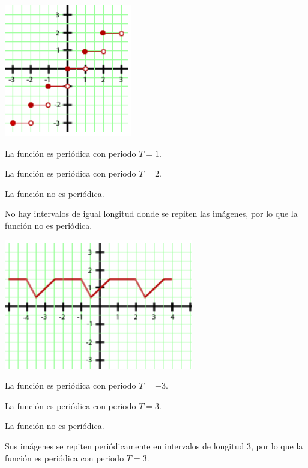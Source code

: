 \includegraphics{samples/propiedades/periodicidad4.jpg}
\begin{scq}
	\begin{choices}
		\begin{choice}
			La función es periódica con periodo $T=1$.	
		\end{choice}
		\begin{choice}[x]
			La función es periódica con periodo $T=2$.
		\end{choice}	
		\begin{choice}[x]
			La función no es periódica.
		\end{choice}
	\end{choices}
	\begin{feedback}
		No hay intervalos de igual longitud donde se repiten las imágenes, por lo que la función no es periódica.
	\end{feedback}
\end{scq}


\includegraphics{samples/propiedades/periodicidad5.jpg}
\begin{scq}
	\begin{choices}
		\begin{choice}
			La función es periódica con periodo $T=-3$.	
		\end{choice}
		\begin{choice}[x]
			La función es periódica con periodo $T=3$.
		\end{choice}	
		\begin{choice}
			La función no es periódica.
		\end{choice}
	\end{choices}
	\begin{feedback}
		Sus imágenes se repiten periódicamente en intervalos de longitud 3, por lo que la función es periódica con periodo $T=3$.
	\end{feedback}
\end{scq}
